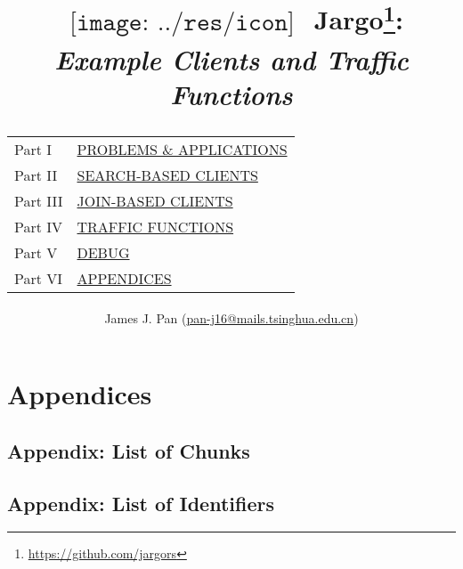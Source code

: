 \documentclass{report}
\title{
  $
  \begin{array}{l}
  \texttt{[image: ../res/icon]}
  \end{array}
  $
  Jargo\footnote{\url{https://github.com/jargors}}:\\
  \large{\textbf{\textit{Example Clients and Traffic Functions}}}\\
  \vspace{2em}
  {
    \small
    \begin{tabular}{lp{.6\textwidth}}
    \toprule
    Part I &\hyperref[part-problems]{\textsc{PROBLEMS \& APPLICATIONS}}\\
    Part II &\hyperref[part-search]{\textsc{SEARCH-BASED CLIENTS}}\\
    Part III &\hyperref[part-join]{\textsc{JOIN-BASED CLIENTS}}\\
    Part IV &\hyperref[part-traffic]{\textsc{TRAFFIC FUNCTIONS}}\\
    Part V &\hyperref[part-debug]{\textsc{DEBUG}}\\
    Part VI &\hyperref[part-appendices]{\textsc{APPENDICES}}\\
    \bottomrule
    \end{tabular}
  }
}
\author{
  \small{James J. Pan (\href{mailto:pan-j16@mails.tsinghua.edu.cn}{pan-j16@mails.tsinghua.edu.cn})}
}
\theoremstyle{definition}                   %
\begin{document}
\maketitle
\pagestyle{noweb}

\renewcommand{\thepage}{\roman{page}}
\setcounter{page}{1}

\tableofcontents



\part{Appendices}
\label{part-appendices}

\appendix

\chapter{Appendix: List of Chunks}
\nowebchunks

\chapter{Appendix: List of Identifiers}
\nowebindex
\end{document}
